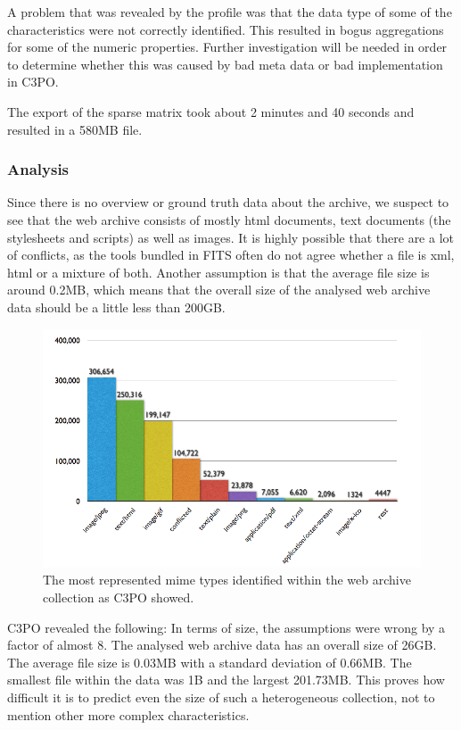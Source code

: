 A problem that was revealed by the profile was that the data type of some of the characteristics were not correctly identified. This resulted in bogus aggregations for some of the numeric properties. Further investigation will be needed in order to determine whether this was caused by bad meta data or bad implementation in C3PO.

The export of the sparse matrix took about 2 minutes and 40 seconds and resulted in a 580MB file.

\subsubsection{Analysis}
Since there is no overview or ground truth data about the archive, we suspect to see that the web archive consists of mostly html documents, text documents (the stylesheets and scripts) as well as images. It is highly possible that there are a lot of conflicts, as the tools bundled in FITS often do not agree whether a file is xml, html or a mixture of both.
Another assumption is that the average file size is around 0.2MB, which means that the overall size of the analysed web archive data should be a little less than 200GB.

\begin{figure}[th]
\begin{center}
\includegraphics[width=5.5in]{figures/usecases/sb/sb_mimetypes.png}
\caption{The most represented mime types identified within the web archive collection as C3PO showed.}
\label{fig:sb_mimetypes}
\end{center}
\end{figure}

\vspace{-1em}
C3PO revealed the following: In terms of size, the assumptions were wrong by a factor of almost 8. The analysed web archive data has an overall size of  26GB. The average file size is 0.03MB with a standard deviation of 0.66MB. The smallest file within the data was 1B and the largest 201.73MB. This proves how difficult it is to predict even the size of such a heterogeneous collection, not to mention other more complex characteristics.

